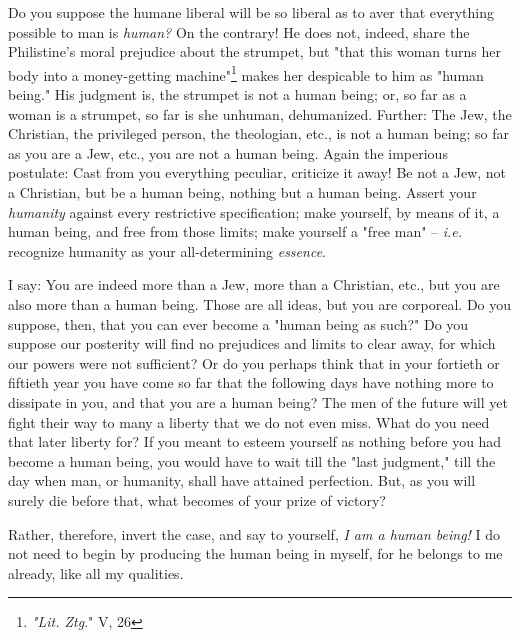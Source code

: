 Do you suppose the humane liberal will be so liberal as to aver that 
everything possible to man is \textit{human?} On the contrary! He does not, 
indeed, share the Philistine's moral prejudice about the strumpet, but "{}that 
this woman turns her body into a money-getting 
machine"{}\footnote{\textit{"{}Lit. Ztg}."{} V, 26} makes her despicable to 
him as "{}human being."{} His judgment is, the strumpet is not a human being; 
or, so far as a woman is a strumpet, so far is she unhuman, dehumanized. 
Further: The Jew, the Christian, the privileged person, the theologian, etc., 
is not a human being; so far as you are a Jew, etc., you are not a human 
being. Again the imperious postulate: Cast from you everything peculiar, 
criticize it away! Be not a Jew, not a Christian, but be a human being, 
nothing but a human being. Assert your \textit{humanity} against every 
restrictive specification; make yourself, by means of it, a human being, and 
free from those limits; make yourself a "{}free man"{} -- \textit{i.e.} 
recognize humanity as your all-determining \textit{essence}.

I say: You are indeed more than a Jew, more than a Christian, etc., but you 
are also more than a human being. Those are all ideas, but you are corporeal. 
Do you suppose, then, that you can ever become a "{}human being as such?"{} Do 
you suppose our posterity will find no prejudices and limits to clear away, 
for which our powers were not sufficient? Or do you perhaps think that in your 
fortieth or fiftieth year you have come so far that the following days have 
nothing more to dissipate in you, and that you are a human being? The men of 
the future will yet fight their way to many a liberty that we do not even 
miss. What do you need that later liberty for? If you meant to esteem yourself 
as nothing before you had become a human being, you would have to wait till 
the "{}last judgment,"{} till the day when man, or humanity, shall have 
attained perfection. But, as you will surely die before that, what becomes of 
your prize of victory?

Rather, therefore, invert the case, and say to yourself, \textit{I am a human 
being!} I do not need to begin by producing the human being in myself, for he 
belongs to me already, like all my qualities.

